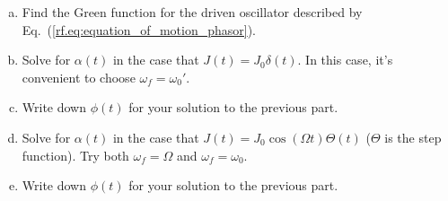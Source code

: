 


\begin{enumerate}[(a)]
  \item Find the Green function for the driven oscillator described by Eq.~(\ref{rf.eq:equation_of_motion_phasor}).
  \item Solve for $\alpha(t)$ in the case that $J(t) = J_0 \delta(t)$. In this case, it's convenient to choose $\omega_f = \omega_0'$.
  \item Write down $\phi(t)$ for your solution to the previous part.
  \item Solve for $\alpha(t)$ in the case that $J(t) = J_0 \cos(\Omega t)\Theta(t)$ ($\Theta$ is the step function). Try both $\omega_f = \Omega$ and $\omega_f = \omega_0$.
  \item Write down $\phi(t)$ for your solution to the previous part.
\end{enumerate}

